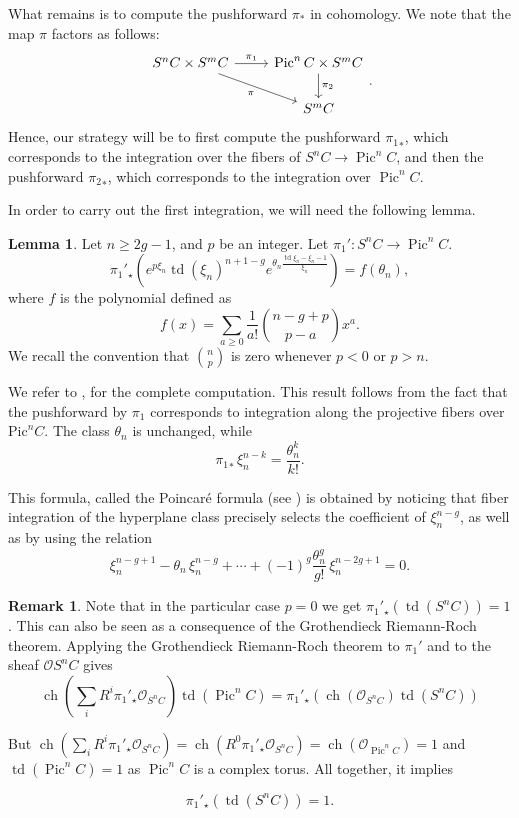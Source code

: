 \documentclass{article}
\theoremstyle{definition}
\newcounter{sharedcounter}[section]
\newtheorem{lemma}[sharedcounter]{Lemma}
\newtheorem{remark}[sharedcounter]{Remark}
\DeclareMathOperator{\pic}{\text{Pic}}
\DeclareMathOperator{\ch}{ch}
\DeclareMathOperator{\td}{td}
\renewcommand{\geq}{\geqslant}
\begin{document}
What remains is to compute the pushforward $\pi_*$ in cohomology. We note that the map $\pi$ factors as follows:
\[
\begin{tikzcd}
S^n C \times S^m C \arrow[r, "\pi_1"] \arrow[dr, "\pi"'] & \operatorname{Pic}^n C \times S^m C \arrow[d, "\pi_2"] \\
& S^m C
\end{tikzcd}.
\]
Hence, our strategy will be to first compute the pushforward ${\pi_1}_*$, which corresponds to the integration over the fibers of $S^nC\to \pic^n C$, and then the pushforward ${\pi_2}_*$, which corresponds to the integration over $\pic^n C$. 

In order to carry out the first integration, we will need the following lemma. 

\begin{lemma}
\label{lem:firstpushforward_lemma1}
Let $n\geq 2g-1$, and $p$ be an integer. Let $\pi_1':S^nC \to \pic^n C$.
$${\pi_1}'_\star \left( e^{p \xi_n}\td(\xi_n)^{n+1-g}  e^{\theta_n \frac{\td \xi_n -\xi_n-1}{\xi_n}} \right)=f(\theta_n),$$
where $f$ is the polynomial defined as $$f(x)= \sum_{a\geqslant 0} \frac{1}{a!} \binom{n-g+p}{p-a} x^a.$$ We recall the convention that $\binom{n}{p}$ is zero whenever $p<0$ or $p>n$.



We refer to \cite[Lemma 4.2.2]{Aldonza_Dupont_2025}, \cite[Lemma 4.10]{Klevtsov_Zvonkine_2025} for the complete computation. This result follows from the fact that the pushforward by $\pi_1$ corresponds to integration along the projective fibers over $\mathrm{Pic}^n C$. The class $\theta_n$ is unchanged, while
\[
{\pi_1}_*\,\xi_n^{n-k}=\frac{\theta_n^k}{k!}.
\]

This formula, called the Poincaré formula (see \cite[\S 5]{Griffiths_book}) is obtained by noticing that fiber integration of the hyperplane class precisely selects the coefficient of $\xi_n^{n-g}$, as well as by using the relation
\[
\xi_n^{n-g+1}-\theta_n \,\xi_n^{n-g}+\cdots+(-1)^g\frac{\theta_n^g}{g!}\,\xi_n^{n-2g+1}=0.
\]

\end{lemma}

\begin{remark}\label{rem2}
Note that in the particular case $p=0$ we get ${\pi_1}'_\star \left(\td(S^nC)\right)=1$. This can also be seen as a consequence of the Grothendieck Riemann-Roch theorem. Applying the Grothendieck Riemann-Roch theorem to $\pi_1'$ and to the sheaf $\mathcal{O}{S^n C}$ gives
$$\ch\left(\sum_i R^i {\pi_1}'_\star \mathcal{O}_{S^{n}C}\right) \td\left(\pic^{n} C\right)={\pi_1}'_\star \left( \ch\left(\mathcal{O}_{S^{n}C}\right)\td\left( S^{n} C \right)\right)$$


But $\ch\left( \sum_i R^i {\pi_1}'_\star \mathcal{O}_{S^n C} \right) = \ch\left(R^0 {\pi_1}'_\star \mathcal{O}_{S^n C}\right)=\ch\left(\mathcal{O}_{\pic^{n} C}\right)=1$ and $\td\left(\pic^{n} C\right)=1$ as $\pic^{n} C$ is a complex torus. All together, it implies 

$${\pi_1}'_\star \left(\td\left(S^n C \right)\right)=1.$$


\end{remark}
\end{document}
